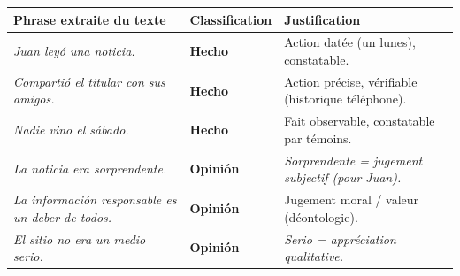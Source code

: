\documentclass[11pt]{article}
\newcommand{\esp}[1]{\ifmmode\text{\textit{#1}}\else\begingroup\selectlanguage{spanish}\itshape #1\endgroup\fi}
\begin{document}
\begin{center}
\begin{tabularx}{\linewidth}{|X|X|X|}
\hline
\rowcolor{popblueL} Phrase extraite du texte & Classification & Justification \\
\hline
\esp{Juan leyó una noticia.} & \textbf{Hecho} & Action datée (un lunes), constatable. \\
\hline
\esp{Compartió el titular con sus amigos.} & \textbf{Hecho} & Action précise, vérifiable (historique téléphone). \\
\hline
\esp{Nadie vino el sábado.} & \textbf{Hecho} & Fait observable, constatable par témoins. \\
\hline
\esp{La noticia era sorprendente.} & \textbf{Opinión} & \esp{Sorprendente} = jugement subjectif (pour Juan). \\
\hline
\esp{La información responsable es un deber de todos.} & \textbf{Opinión} & Jugement moral / valeur (déontologie). \\
\hline
\esp{El sitio no era un medio serio.} & \textbf{Opinión} & \esp{Serio} = appréciation qualitative. \\
\hline
\end{tabularx}
\end{center}
\end{document}
